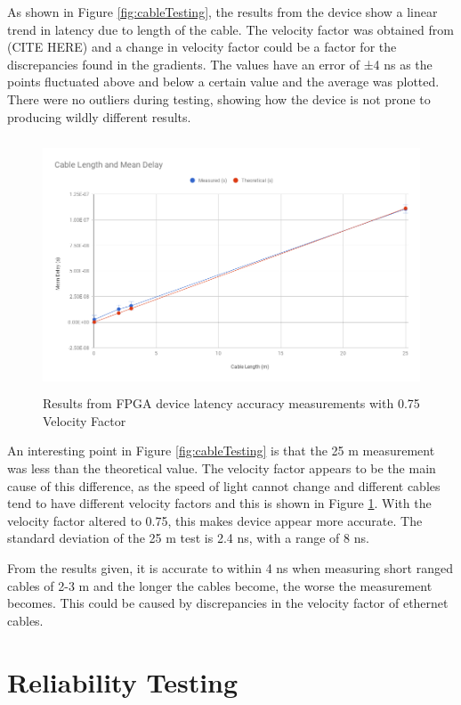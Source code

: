 As shown in Figure \ref{fig:cableTesting}, the results from the device show a linear trend in latency due to length 
of the cable. The velocity factor was obtained from (CITE HERE) and a change in velocity factor could be a factor 
for the discrepancies found in the gradients. The values have an error of ±4 ns as the points fluctuated above and 
below a certain value and the average was plotted. There were no outliers during testing, showing how the device is 
not prone to producing wildly different results.

\begin{figure}[H]
    \begin{center}
        \includegraphics[keepaspectratio,height=7.5cm]{Images/CableTesting075}
        \caption{Results from FPGA device latency accuracy measurements with 0.75 Velocity Factor}
        \label{fig:cableTesting075}
    \end{center}
\end{figure}

An interesting point in Figure \ref{fig:cableTesting} is that the 25 m measurement was less than the theoretical 
value. The velocity factor appears to be the main cause of this difference, as the speed of light cannot change and 
different cables tend to have different velocity factors and this is shown in Figure \ref{fig:cableTesting075}. With 
the velocity factor altered to 0.75, this makes device appear more accurate. The standard deviation of the 25 m test 
is 2.4 ns, with a range of 8 ns.

From the results given, it is accurate to within 4 ns when measuring short ranged cables of 2-3 m and the longer the 
cables become, the worse the measurement becomes. This could be caused by discrepancies in the velocity factor of 
ethernet cables.

\section{Reliability Testing}

